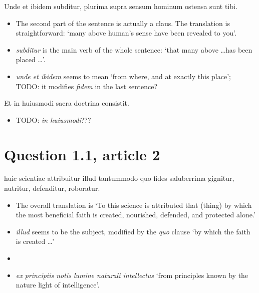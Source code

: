 \documentclass[a4paper, 12pt]{article}
\newcommand{\form}[1]{\emph{#1}}
\newcommand{\translate}[1]{`#1'}
\begin{document}
\begin{exe}
    \ex Unde et ibidem subditur, plurima supra sensum hominum ostensa sunt tibi.
\end{exe}

\begin{itemize}
    \item The second part of the sentence is actually a claus.
    The translation is straightforward: 
    \translate{many above human's sense have been revealed to you}.
    \item \form{subditur} is the main verb of the whole sentence:
    \translate{that many above \dots has been placed \dots}.
    \item \form{unde et ibidem} seems to mean \translate{from where, and at exactly this place}; 
    TODO: it modifies \form{fidem} in the last sentence?
\end{itemize}

\begin{exe}
    \ex Et in huiusmodi sacra doctrina consistit.
\end{exe}

\begin{itemize}
    \item TODO: \form{in huiusmodi}???
\end{itemize}



\section{Question 1.1, article 2}

\begin{exe}
    \ex huic scientiae attribuitur illud tantummodo quo fides saluberrima gignitur, nutritur, defenditur, roboratur. 
\end{exe}

\begin{itemize}
    \item The overall translation is 
    \translate{To this science is attributed that (thing) by which the most beneficial faith is created, nourished, defended, and protected alone.}
    \item \form{illud} seems to be the subject, modified by the \form{quo} clause \translate{by which the faith is created \dots}
    \item 
\end{itemize}

\begin{itemize}
    \item \form{ex principiis notis lumine naturali intellectus} \translate{from principles known by the nature light of intelligence}.
\end{itemize}
\end{document}
